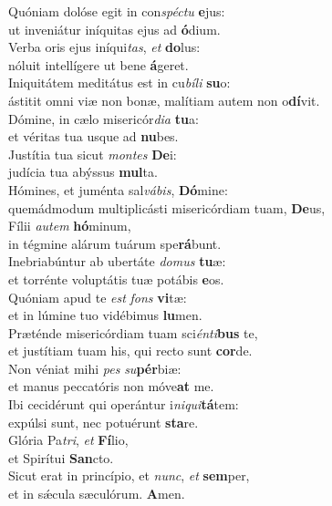 \evenverse Quóniam dolóse egit in con\textit{spé}\textit{ctu} \textbf{e}jus:~\*\\
\evenverse ut inveniátur iníquitas ejus ad \textbf{ó}dium.\\
\oddverse Verba oris ejus iníqui\textit{tas}, \textit{et} \textbf{do}lus:~\*\\
\oddverse nóluit intellígere ut bene \textbf{á}geret.\\
\evenverse Iniquitátem meditátus est in cu\textit{bí}\textit{li} \textbf{su}o:~\*\\
\evenverse ástitit omni viæ non bonæ, malítiam autem non o\textbf{dí}vit.\\
\oddverse Dómine, in cælo misericór\textit{di}\textit{a} \textbf{tu}a:~\*\\
\oddverse et véritas tua usque ad \textbf{nu}bes.\\
\evenverse Justítia tua sicut \textit{mon}\textit{tes} \textbf{De}i:~\*\\
\evenverse judícia tua abýssus \textbf{mul}ta.\\
\oddverse Hómines, et juménta sal\textit{vá}\textit{bis}, \textbf{Dó}mine:~\*\\
\oddverse quemádmodum multiplicásti misericórdiam tuam, \textbf{De}us,\\
\evenverse Fílii \textit{au}\textit{tem} \textbf{hó}minum,~\*\\
\evenverse in tégmine alárum tuárum spe\textbf{rá}bunt.\\
\oddverse Inebriabúntur ab ubertáte \textit{do}\textit{mus} \textbf{tu}æ:~\*\\
\oddverse et torrénte voluptátis tuæ potábis \textbf{e}os.\\
\evenverse Quóniam apud te \textit{est} \textit{fons} \textbf{vi}tæ:~\*\\
\evenverse et in lúmine tuo vidébimus \textbf{lu}men.\\
\oddverse Præténde misericórdiam tuam sci\textit{én}\textit{ti}\textbf{bus} te,~\*\\
\oddverse et justítiam tuam his, qui recto sunt \textbf{cor}de.\\
\evenverse Non véniat mihi \textit{pes} \textit{su}\textbf{pér}biæ:~\*\\
\evenverse et manus peccatóris non móve\textbf{at} me.\\
\oddverse Ibi cecidérunt qui operántur i\textit{ni}\textit{qui}\textbf{tá}tem:~\*\\
\oddverse expúlsi sunt, nec potuérunt \textbf{sta}re.\\
\evenverse Glória Pa\textit{tri}, \textit{et} \textbf{Fí}lio,~\*\\
\evenverse et Spirítui \textbf{San}cto.\\
\oddverse Sicut erat in princípio, et \textit{nunc}, \textit{et} \textbf{sem}per,~\*\\
\oddverse et in sǽcula sæculórum. \textbf{A}men.\\

